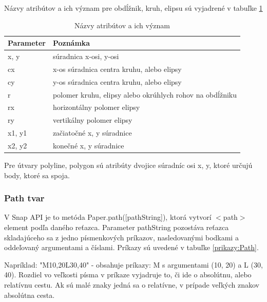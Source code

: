 Názvy atribútov a ich význam pre obdĺžnik, kruh, elipsu sú vyjadrené v tabuľke \ref{parametre:tvar} 

\begin{table}[H]
	\begin{center}
		\begin{tabular}{|l|l|}
			\hline \textbf{Parameter} & \textbf{Poznámka} \\ 
			\hline
			\hline x, y & súradnica x-osi, y-osi  \\ 
			\hline cx & x-os súradnica centra kruhu, alebo elipsy \\ 
			\hline cy & y-os súradnica centra kruhu, alebo elipsy \\ 
			\hline r & polomer kruhu, elipsy alebo okrúhlych rohov na obdĺžniku\\ 
			\hline rx & horizontálny polomer elipsy \\ 
			\hline ry & vertikálny polomer elipsy \\ 
			\hline x1, y1 & začiatočné x, y súradnice \\
			\hline x2, y2 & konečné x, y súradnice \\
			\hline
		\end{tabular} 
		
	\end{center}
	\caption{Názvy atribútov a ich význam}
	\label{parametre:tvar}
\end{table}

Pre útvary polyline, polygon sú atribúty dvojice súradníc osi x, y, ktoré určujú body, ktoré sa spoja. 



\subsubsection{Path tvar}


V Snap API je to metóda Paper.path([pathString]), ktorá vytvorí $<$path$>$ element podľa daného reťazca.  Parameter pathString pozostáva reťazca skladajúceho sa z jedno písmenkových príkazov, nasledovanými bodkami a oddeľovaný argumentami a číslami. Príkazy sú uvedené v tabuľke \ref{prikazy:Path}.

Napríklad: "M10,20L30,40" - obsahuje príkazy: M s argumentami (10, 20) a L (30, 40). Rozdiel vo veľkosti písma v príkaze vyjadruje to, či ide o absolútnu, alebo relatívnu cestu. Ak sú malé znaky jedná sa o relatívne, v prípade veľkých znakov absolútna cesta. 


